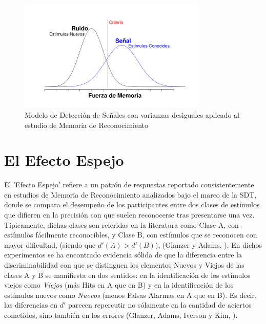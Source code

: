 \begin{figure}[th]
\centering
\includegraphics[width=0.80\textwidth]{Figures/RM_SDT_2} 
\caption[SDT en Memoria de Reconocimiento (Varianzas Desiguales)]{Modelo de Detección de Señales con varianzas desiguales aplicado al estudio de Memoria de Reconocimiento}
\label{fig:RM_SDT_2}
\end{figure}














\section{El Efecto Espejo}

El 'Efecto Espejo' refiere a un patrón de respuestas reportado consistentemente en estudios de Memoria de Reconocimiento analizados bajo el marco de la SDT, donde se compara el desempeño de los participantes entre dos clases de estímulos que difieren en la precisión con que suelen reconocerse tras presentarse una vez. Típicamente, dichas clases son referidas en la literatura como Clase A, con estímulos fácilmente reconocibles, y Clase B, con estímulos que se reconocen con mayor dificultad, (siendo que $d'(A) > d'(B)$), (Glanzer y Adams, \citeyear{Glanzer1990}). En dichos experimentos se ha encontrado evidencia sólida de que la diferencia entre la discriminabilidad con que se distinguen los elementos Nuevos y Viejos de las clases A y B se manifiesta en dos sentidos: en la identificacíón de los estímulos viejos como \textit{Viejos} (más Hits en A que en B) y en la identificación de los estímulos nuevos como \textit{Nuevos} (menos Falsas Alarmas en A que en B). Es decir, las diferencias en $d'$ parecen repercutir no sólamente en la cantidad de aciertos cometidos, sino también en los errores (Glanzer, Adams, Iverson y Kim, \citeyear{Glanzer1993}).\\

